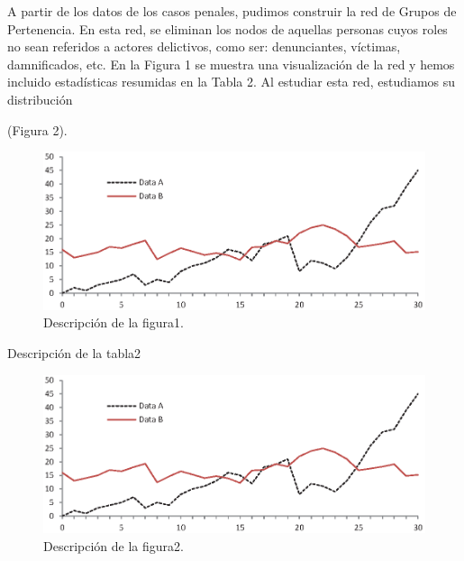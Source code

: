 A partir de los datos de los casos penales, pudimos
construir la red de Grupos de Pertenencia. En esta red, se eliminan los nodos de aquellas personas cuyos roles no sean referidos a actores delictivos, como ser: denunciantes, víctimas, damnificados, etc. En la Figura 1 se muestra una visualización de la red y hemos incluido estadísticas resumidas en la Tabla 2.
Al estudiar esta red, estudiamos su distribución 

(Figura 2). 

\begin{figure}
	\includegraphics[width=\textwidth]{fig1.eps}
	\caption{Descripción de la figura1.} \label{fig1}
\end{figure}

\begin{table}
	\caption{Descripción de la tabla2}\label{tab2}
\end{table}

\begin{figure}
	\includegraphics[width=\textwidth]{fig1.eps}
	\caption{Descripción de la figura2.} \label{fig2}
\end{figure}